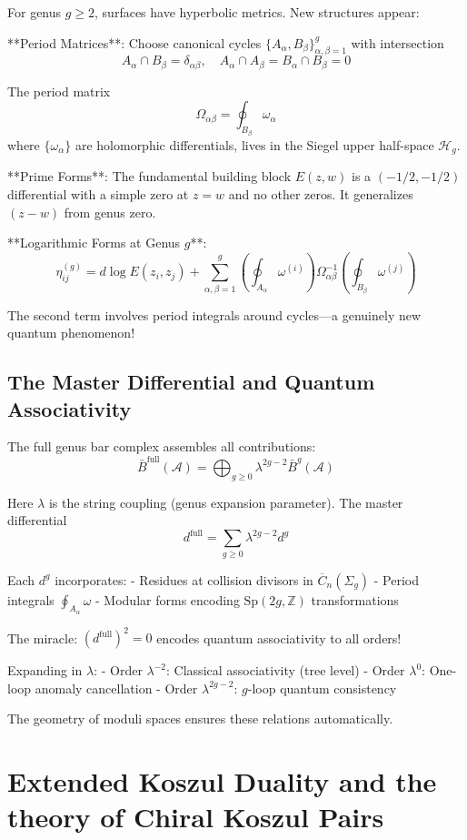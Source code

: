 For genus $g \geq 2$, surfaces have hyperbolic metrics. New structures appear:

**Period Matrices**: Choose canonical cycles $\{A_\alpha, B_\beta\}_{\alpha,\beta=1}^g$ with intersection
$$A_\alpha \cap B_\beta = \delta_{\alpha\beta}, \quad A_\alpha \cap A_\beta = B_\alpha \cap B_\beta = 0$$

The period matrix
$$\Omega_{\alpha\beta} = \oint_{B_\beta} \omega_\alpha$$
where $\{\omega_\alpha\}$ are holomorphic differentials, lives in the Siegel upper half-space $\mathcal{H}_g$.

**Prime Forms**: The fundamental building block $E(z,w)$ is a $(-1/2, -1/2)$ differential with a simple zero at $z = w$ and no other zeros. It generalizes $(z-w)$ from genus zero.

**Logarithmic Forms at Genus $g$**:
$$\eta_{ij}^{(g)} = d\log E(z_i, z_j) + \sum_{\alpha,\beta=1}^g \left(\oint_{A_\alpha} \omega^{(i)}\right) \Omega_{\alpha\beta}^{-1} \left(\oint_{B_\beta} \omega^{(j)}\right)$$

The second term involves period integrals around cycles—a genuinely new quantum phenomenon!

\subsection{The Master Differential and Quantum Associativity}

The full genus bar complex assembles all contributions:
$$\bar{B}^{\text{full}}(\mathcal{A}) = \bigoplus_{g \geq 0} \lambda^{2g-2} \bar{B}^g(\mathcal{A})$$

Here $\lambda$ is the string coupling (genus expansion parameter). The master differential
$$d^{\text{full}} = \sum_{g \geq 0} \lambda^{2g-2} d^g$$

Each $d^g$ incorporates:
- Residues at collision divisors in $\overline{C}_n(\Sigma_g)$
- Period integrals $\oint_{A_\alpha} \omega$
- Modular forms encoding $\text{Sp}(2g, \mathbb{Z})$ transformations

The miracle: $(d^{\text{full}})^2 = 0$ encodes quantum associativity to all orders!

Expanding in $\lambda$:
- Order $\lambda^{-2}$: Classical associativity (tree level)
- Order $\lambda^0$: One-loop anomaly cancellation  
- Order $\lambda^{2g-2}$: $g$-loop quantum consistency

The geometry of moduli spaces ensures these relations automatically.

\section{Extended Koszul Duality and the theory of Chiral Koszul Pairs}

